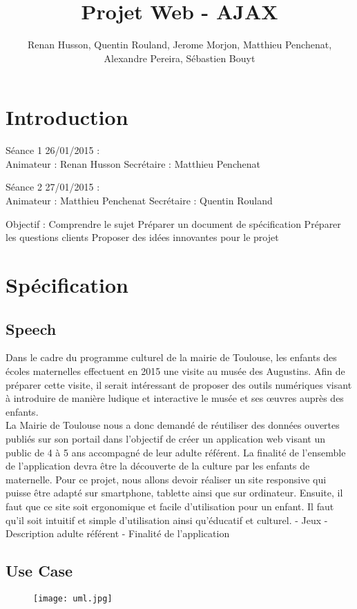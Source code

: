 \documentclass[12pt,a4paper]{report}
\author{Renan Husson, Quentin Rouland, Jerome Morjon, Matthieu Penchenat, Alexandre Pereira, Sébastien Bouyt}
\affil{Université Toulouse, Jean Jaurès - L3 MIASHS \\ Document D1 : Specification Fonctionnelle}
\begin{document}
\title{Projet Web - AJAX}
\maketitle
\renewcommand{\contentsname}{Sommaire}
\tableofcontents
\chapter*{Introduction}
Séance 1 26/01/2015 : \\
Animateur : Renan Husson
Secrétaire : Matthieu Penchenat
\newline

Séance 2 27/01/2015 : \\
Animateur : Matthieu Penchenat
Secrétaire : Quentin Rouland
\newline

Objectif :
Comprendre le sujet
Préparer un document de spécification
Préparer les questions clients
Proposer des idées innovantes pour le projet
\chapter{Spécification}
\section{Speech}
Dans le cadre du programme culturel de la mairie de Toulouse, les enfants des écoles maternelles effectuent en 2015 une visite au musée des Augustins. Afin de préparer cette visite, il serait intéressant de proposer des outils numériques visant à introduire de manière ludique et interactive le musée et ses œuvres auprès des enfants.\\
La Mairie de Toulouse nous a donc demandé de réutiliser des données ouvertes publiés sur son portail dans l'objectif de créer un application web visant un public de 4 à 5 ans accompagné de leur adulte référent. La finalité de l'ensemble de l'application devra être la découverte de la culture par les enfants de maternelle.
Pour ce projet, nous allons devoir réaliser un site responsive qui puisse être adapté sur smartphone, tablette ainsi que sur ordinateur. Ensuite, il faut que ce site soit ergonomique et facile d'utilisation pour un enfant. Il faut qu'il soit intuitif et simple d'utilisation ainsi qu'éducatif et culturel.
- Jeux
- Description adulte référent
- Finalité de l'application
\section{Use Case}
\begin{figure}[!h]
\centering
\texttt{[image: uml.jpg]}
\end{figure}
\end{document}
